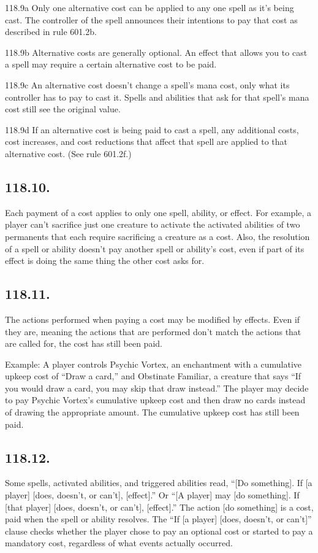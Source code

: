 118.9a Only one alternative cost can be applied to any one spell as it’s being cast. The controller of the spell announces their intentions to pay that cost as described in rule 601.2b.

118.9b Alternative costs are generally optional. An effect that allows you to cast a spell may require a certain alternative cost to be paid.

118.9c An alternative cost doesn’t change a spell’s mana cost, only what its controller has to pay to cast it. Spells and abilities that ask for that spell’s mana cost still see the original value.

118.9d If an alternative cost is being paid to cast a spell, any additional costs, cost increases, and cost reductions that affect that spell are applied to that alternative cost. (See rule 601.2f.)

\subsection*{118.10.}
Each payment of a cost applies to only one spell, ability, or effect. For example, a player can’t sacrifice just one creature to activate the activated abilities of two permanents that each require sacrificing a creature as a cost. Also, the resolution of a spell or ability doesn’t pay another spell or ability’s cost, even if part of its effect is doing the same thing the other cost asks for.

\subsection*{118.11.}
The actions performed when paying a cost may be modified by effects. Even if they are, meaning the actions that are performed don’t match the actions that are called for, the cost has still been paid.

Example: A player controls Psychic Vortex, an enchantment with a cumulative upkeep cost of “Draw a card,” and Obstinate Familiar, a creature that says “If you would draw a card, you may skip that draw instead.” The player may decide to pay Psychic Vortex’s cumulative upkeep cost and then draw no cards instead of drawing the appropriate amount. The cumulative upkeep cost has still been paid.

\subsection*{118.12.}
Some spells, activated abilities, and triggered abilities read, “[Do something]. If [a player] [does, doesn’t, or can’t], [effect].” Or “[A player] may [do something]. If [that player] [does, doesn’t, or can’t], [effect].” The action [do something] is a cost, paid when the spell or ability resolves. The “If [a player] [does, doesn’t, or can’t]” clause checks whether the player chose to pay an optional cost or started to pay a mandatory cost, regardless of what events actually occurred.

